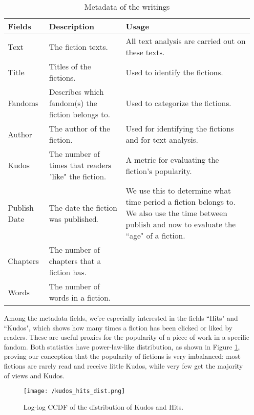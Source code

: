 \documentclass[a4paper]{article}
\begin{document}
\begin{table}[htp]
\caption{Metadata of the writings}
\begin{center}
\begin{tabular}[width=0.8\textwidth]{p{2cm}|p{4cm}|p{5cm}}
  \hline			
 Fields & Description & Usage\\ 
   \hline			
Text & The fiction texts. & All text analysis are carried out on these texts.\\\hline
Title & Titles of the fictions. & Used to identify the fictions. \\\hline
Fandoms & Describes which fandom(s) the fiction belongs to. & Used to categorize the fictions.\\\hline
Author & The author of the fiction. & Used for identifying the fictions and for text analysis. \\\hline
Kudos & The number of times that readers "like" the fiction. &  A metric for evaluating the fiction's popularity.\\\hline
Publish Date & The date the fiction was published. & We use this to determine what time period a fiction belongs to. We also use the time between publish and now to evaluate the ``age" of a fiction.\\\hline
Chapters & The number of chapters that a fiction has. \\\hline
Words & The number of words in a fiction.\\\hline

\hline
\end{tabular}
\end{center}
\label{tab:metadata}
\end{table}%

Among the metadata fields, we're especially interested in the fields ``Hits" and ``Kudos", which shows how many times a fiction has been clicked or liked by readers. These are useful proxies for the popularity of a piece of work in a specific fandom.
Both statistics have power-law-like distribution, as shown in  Figure \ref{fig:long_tail}, proving our conception that the popularity of fictions is very imbalanced: most fictions are rarely read and receive little Kudos, while very few get the majority of views and Kudos.

\begin{figure}[htbp]
\begin{center}
\texttt{[image: /kudos\_hits\_dist.png]}
\caption{Log-log CCDF of the distribution of Kudos and Hits.}
\label{fig:long_tail}
\end{center}
\end{figure}
\end{document}
